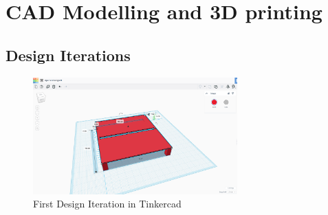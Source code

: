 \section{CAD Modelling and 3D printing}
\subsection{Design Iterations}

\begin{figure}[htbp]
    \centering
    \includegraphics[width=0.7\textwidth]{figures/Appendix-CAD/tinkercad_design.png}
    \caption*{First Design Iteration in Tinkercad} 
    \label{fig:tinkercad-design}
    \end{figure}
